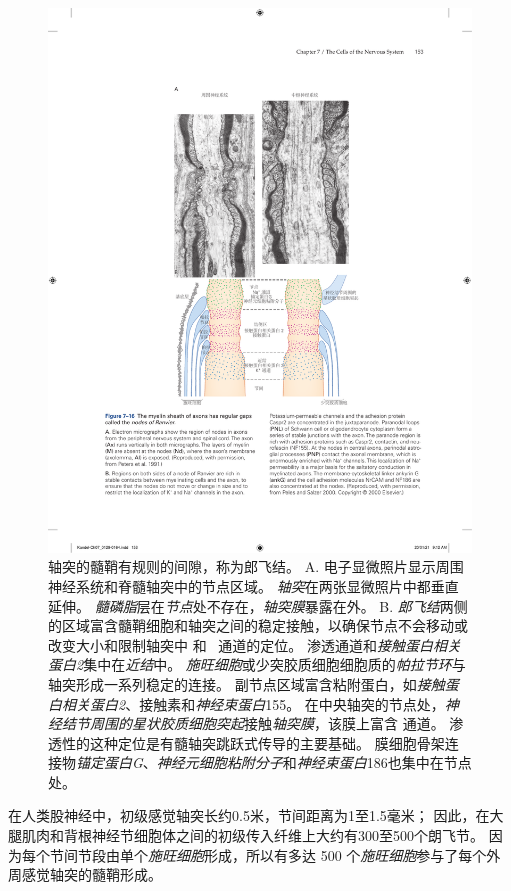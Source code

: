 \begin{figure}[htbp]
	\centering
	\includegraphics[width=0.75\linewidth]{chap07/fig_7_16}
	\caption{轴突的髓鞘有规则的间隙，称为郎飞结。
		A. 电子显微照片显示周围神经系统和脊髓轴突中的节点区域。
		\textit{轴突}在两张显微照片中都垂直延伸。
		\textit{髓磷脂}层在\textit{节点}处不存在，\textit{轴突膜}暴露在外\cite{peters1991neuropil}。
		B. \textit{郎飞结}两侧的区域富含髓鞘细胞和轴突之间的稳定接触，以确保节点不会移动或改变大小和限制轴突中  和~ 通道的定位。
		渗透通道和\textit{接触蛋白相关蛋白2}集中在\textit{近结}中。
		\textit{施旺细胞}或少突胶质细胞细胞质的\textit{帕拉节环}与轴突形成一系列稳定的连接。
		副节点区域富含粘附蛋白，如\textit{接触蛋白相关蛋白2}、接触素和\textit{神经束蛋白}155。
		在中央轴突的节点处，\textit{神经结节周围的星状胶质细胞突起}接触\textit{轴突膜}，该膜上富含  通道。
		 渗透性的这种定位是有髓轴突跳跃式传导的主要基础。
		膜细胞骨架连接物\textit{锚定蛋白G}、\textit{神经元细胞粘附分子}和\textit{神经束蛋白}186也集中在节点处\cite{peles2000molecular}。}
	\label{fig:7_16}
\end{figure}


在人类股神经中，初级感觉轴突长约0.5米，节间距离为1至1.5毫米；
因此，在大腿肌肉和背根神经节细胞体之间的初级传入纤维上大约有300至500个朗飞节。
因为每个节间节段由单个\textit{施旺细胞}形成，所以有多达 500 个\textit{施旺细胞}参与了每个外周感觉轴突的髓鞘形成。


